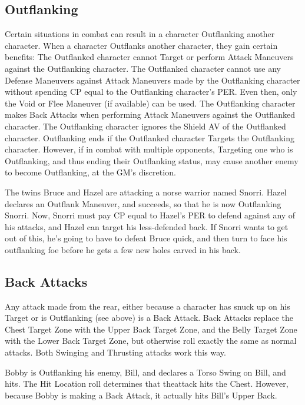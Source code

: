 \documentclass[oneside,11pt,english]{book}
\begin{document}
\subsection{Outflanking} %
Certain situations in combat can result in a character Outflanking another character. When a character
Outflanks another character, they gain certain benefits:
The Outflanked character cannot Target or perform Attack Maneuvers against the Outflanking
character.
The Outflanked character cannot use any Defense Maneuvers against Attack Maneuvers made by
the Outflanking character without spending CP equal to the Outflanking character’s PER. Even
then, only the Void or Flee Maneuver (if available) can be used.
The Outflanking character makes Back Attacks when performing Attack Maneuvers against the
Outflanked character.
The Outflanking character ignores the Shield AV of the Outflanked character.
Outflanking ends if the Outflanked character Targets the Outflanking character. However, if in combat
with multiple opponents, Targeting one who is Outflanking, and thus ending their Outflanking status, may
cause another enemy to become Outflanking, at the GM’s discretion.

The twins Bruce and Hazel are attacking a norse warrior named Snorri. Hazel declares an Outflank Maneuver, and succeeds, so that he is now Outflanking Snorri. Now, Snorri must pay CP equal to Hazel’s PER to defend against any of his attacks, and Hazel can target his less-defended back. If Snorri wants to get out of this, he’s going to have to defeat Bruce quick, and then turn to face his outflanking foe before he gets a few new holes carved in his back.

\subsection{Back Attacks} %
Any attack made from the rear, either because a character has snuck up on his Target or is Outflanking
(see above) is a Back Attack.
Back Attacks replace the Chest Target Zone with the Upper Back Target Zone, and the Belly Target Zone
with the Lower Back Target Zone, but otherwise roll exactly the same as normal attacks. Both Swinging
and Thrusting attacks work this way.

Bobby is Outflanking his enemy, Bill, and declares a Torso Swing on Bill, and hits. The Hit Location roll determines that theattack hits the Chest. However, because Bobby is making a Back Attack, it actually hits Bill’s Upper Back.
\end{document}
